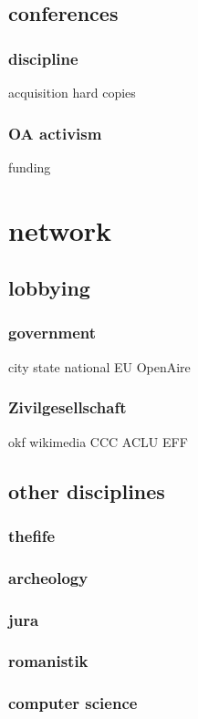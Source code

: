 \documentclass[output=guidelines,guidelines] {langscibook}
\begin{document}
\subsection{conferences}
\subsubsection{discipline}
                    acquisition
                    hard copies
\subsubsection{OA activism}
                    funding
\section{network}
\subsection{lobbying}
\subsubsection{government}
                    city 
                    state
                    national
                    EU
                        OpenAire
\subsubsection{Zivilgesellschaft}
                    okf
                    wikimedia
                    CCC
                    ACLU
                    EFF
\subsection{other disciplines}
\subsubsection{thefife}
\subsubsection{archeology}
\subsubsection{jura}
\subsubsection{romanistik}
\subsubsection{computer science}
\end{document}
